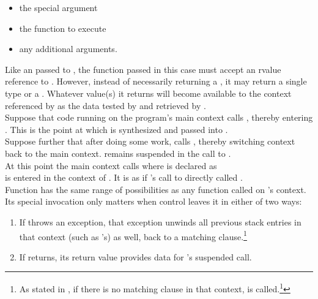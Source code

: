 \begin{itemize}
  \item the special argument 
  \item the function to execute
  \item any additional arguments.
\end{itemize}

Like an \entryfn passed to \callcc, the function passed in this case must
accept an rvalue reference to \cont. However, instead of necessarily returning
a \cont, it may return a single type or a . Whatever value(s)
it returns will become available to the context referenced by  as
the data tested by \dataavail and retrieved by \getdata.\\

Suppose that code running on the program's main context calls ,
thereby entering . This is the point at which  is synthesized
and passed into .\\
Suppose further that after doing some work,  calls ,
thereby switching context back to the main context.  remains suspended
in the call to .\\
At this point the main context calls 
where  is declared as\\
  is entered in the context of .
It is as if 's call to  directly called .\\
Function  has the same range of possibilities as any function called on
's context. Its special invocation only matters when control leaves it
in either of two ways:

\begin{enumerate}
  \item If  throws an exception, that exception unwinds all previous
        stack entries in that context (such as 's) as well, back to a
        matching  clause.\footnote{As stated in ,
        if there is no matching  clause in that context,
         is called.\footnote{There are only two ways to
        terminate a given context without terminating the whole process. One
        is to switch to some context that will destroy the continuation passed
        (or returned) to it. The other is to return a valid continuation from
        the \entryfn. If an  function throws an
        exception, it is good practice to bind into the exception object
        the continuation passed into the  function so that
        a  clause in the \entryfn can return that continuation.}}
  \item If  returns, its return value provides data for
        's suspended  call.
\end{enumerate}

